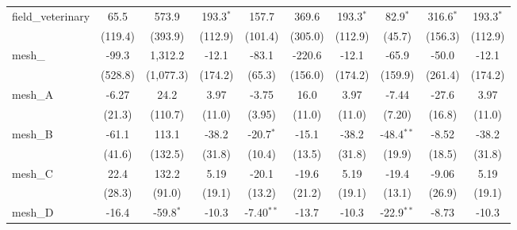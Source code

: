 \begin{tabular}{lccccccccc}
   field\_veterinary                                           & 65.5             & 573.9           & 193.3$^{*}$    & 157.7         & 369.6         & 193.3$^{*}$    & 82.9$^{*}$    & 316.6$^{*}$   & 193.3$^{*}$\\   
                                                               & (119.4)          & (393.9)         & (112.9)        & (101.4)       & (305.0)       & (112.9)        & (45.7)        & (156.3)       & (112.9)\\   
   mesh\_                                                      & -99.3            & 1,312.2         & -12.1          & -83.1         & -220.6        & -12.1          & -65.9         & -50.0         & -12.1\\   
                                                               & (528.8)          & (1,077.3)       & (174.2)        & (65.3)        & (156.0)       & (174.2)        & (159.9)       & (261.4)       & (174.2)\\   
   mesh\_A                                                     & -6.27            & 24.2            & 3.97           & -3.75         & 16.0          & 3.97           & -7.44         & -27.6         & 3.97\\   
                                                               & (21.3)           & (110.7)         & (11.0)         & (3.95)        & (11.0)        & (11.0)         & (7.20)        & (16.8)        & (11.0)\\   
   mesh\_B                                                     & -61.1            & 113.1           & -38.2          & -20.7$^{*}$   & -15.1         & -38.2          & -48.4$^{**}$  & -8.52         & -38.2\\   
                                                               & (41.6)           & (132.5)         & (31.8)         & (10.4)        & (13.5)        & (31.8)         & (19.9)        & (18.5)        & (31.8)\\   
   mesh\_C                                                     & 22.4             & 132.2           & 5.19           & -20.1         & -19.6         & 5.19           & -19.4         & -9.06         & 5.19\\   
                                                               & (28.3)           & (91.0)          & (19.1)         & (13.2)        & (21.2)        & (19.1)         & (13.1)        & (26.9)        & (19.1)\\   
   mesh\_D                                                     & -16.4            & -59.8$^{*}$     & -10.3          & -7.40$^{**}$  & -13.7         & -10.3          & -22.9$^{**}$  & -8.73         & -10.3\\   

\end{tabular}
